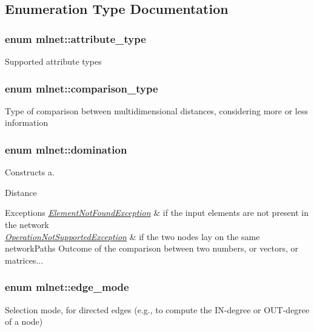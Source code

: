 \subsection{Enumeration Type Documentation}
\hypertarget{namespacemlnet_a8bd10c6e8e4d27ef4d974b3f576a3a06}{
\subsubsection[{attribute\+\_\+type}]{\setlength{\rightskip}{0pt plus 5cm}enum {\bf mlnet\+::attribute\+\_\+type}}}\label{namespacemlnet_a8bd10c6e8e4d27ef4d974b3f576a3a06}
Supported attribute types \hypertarget{namespacemlnet_ac59b03c9fd702da21a0c3c2a4bba57c9}{
\subsubsection[{comparison\+\_\+type}]{\setlength{\rightskip}{0pt plus 5cm}enum {\bf mlnet\+::comparison\+\_\+type}}}\label{namespacemlnet_ac59b03c9fd702da21a0c3c2a4bba57c9}
Type of comparison between multidimensional distances, considering more or less information \hypertarget{namespacemlnet_a49cbf481a06184d43958acdfc5d4fc60}{
\subsubsection[{domination}]{\setlength{\rightskip}{0pt plus 5cm}enum {\bf mlnet\+::domination}}}\label{namespacemlnet_a49cbf481a06184d43958acdfc5d4fc60}


Constructs a. 

Distance 
\begin{DoxyExceptions}{Exceptions}
{\em \hyperlink{class_element_not_found_exception}{Element\+Not\+Found\+Exception}} & if the input elements are not present in the network \\
\hline
{\em \hyperlink{class_operation_not_supported_exception}{Operation\+Not\+Supported\+Exception}} & if the two nodes lay on the same network\+Paths Outcome of the comparison between two numbers, or vectors, or matrices... \\
\hline
\end{DoxyExceptions}
\hypertarget{namespacemlnet_aa4ac93b948a2c3582aeead3f1c4ff022}{
\subsubsection[{edge\+\_\+mode}]{\setlength{\rightskip}{0pt plus 5cm}enum {\bf mlnet\+::edge\+\_\+mode}}}\label{namespacemlnet_aa4ac93b948a2c3582aeead3f1c4ff022}
Selection mode, for directed edges (e.\+g., to compute the I\+N-\/degree or O\+U\+T-\/degree of a node) 

